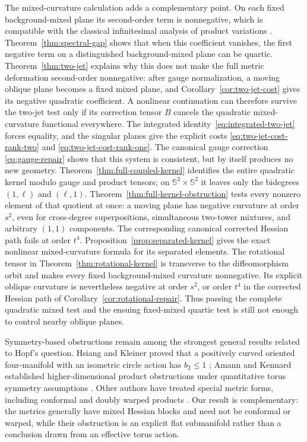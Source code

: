 \documentclass[11pt]{amsart}
\theoremstyle{definition}
\theoremstyle{remark}
\newcommand{\Sph}{\mathbb S}
\begin{document}
The mixed-curvature calculation adds a complementary point.  On each
fixed background-mixed plane its second-order term is nonnegative,
which is compatible with the classical infinitesimal analysis of
product variations \cite{BourguignonDeschampsSentenac1973}.
Theorem~\ref{thm:spectral-gap} shows that when this coefficient
vanishes, the first negative term on a distinguished background-mixed
plane can be quartic.  Theorem~\ref{thm:two-jet} explains why this does
not make the full metric deformation second-order nonnegative: after
gauge normalization, a moving oblique plane becomes a fixed mixed
plane, and Corollary~\ref{cor:two-jet-cost} gives its negative
quadratic coefficient.  A nonlinear continuation can therefore
survive the two-jet test only if its correction tensor $B$ cancels the
quadratic mixed-curvature functional everywhere.  The integrated
identity~\eqref{eq:integrated-two-jet} forces equality, and the
singular planes give the explicit costs
\eqref{eq:two-jet-cost-rank-two} and
\eqref{eq:two-jet-cost-rank-one}.  The canonical gauge correction
\eqref{eq:gauge-repair} shows that this system is consistent, but by
itself produces no new geometry.
Theorem~\ref{thm:full-coupled-kernel} identifies the entire quadratic
kernel modulo gauge and product tensors; on $\Sph^2\times\Sph^2$ it
leaves only the bidegrees $(1,\ell)$ and $(\ell,1)$.
Theorem~\ref{thm:full-kernel-obstruction} tests every nonzero element
of that quotient at once: a moving plane has negative curvature at
order $s^2$, even for cross-degree superpositions, simultaneous
two-tower mixtures, and arbitrary $(1,1)$ components.  The
corresponding canonical corrected Hessian path fails at order $t^4$.
Proposition~\ref{prop:separated-kernel} gives the exact nonlinear
mixed-curvature formula for its separated elements.  The rotational
tensor in Theorem~\ref{thm:rotational-kernel} is transverse to the
diffeomorphism orbit and makes every fixed background-mixed curvature
nonnegative.  Its explicit oblique curvature is nevertheless negative
at order $s^2$, or order $t^4$ in the corrected Hessian path of
Corollary~\ref{cor:rotational-repair}.  Thus passing the complete
quadratic mixed test and the ensuing fixed-mixed quartic test is still
not enough to control nearby oblique planes.

Symmetry-based obstructions remain among the strongest general results
related to Hopf's question.  Hsiang and Kleiner proved that a positively
curved oriented four-manifold with an isometric circle action has
$b_2\leq1$ \cite{HsiangKleiner1989}; Amann and Kennard established
higher-dimensional product obstructions under quantitative torus
symmetry assumptions \cite{AmannKennard2017}.  Other authors have
treated special metric forms, including conformal and doubly warped
products \cite{SeckNiangMasiello2022}.  Our result is complementary:
the metrics generally have mixed Hessian blocks and need not be
conformal or warped, while their obstruction is an explicit flat
submanifold rather than a conclusion drawn from an effective torus
action.
\end{document}
